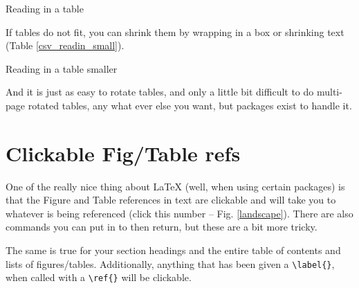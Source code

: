 \begin{table}[h]
\centering
\caption[Normal size table]{Reading in a table}
\label{csv_readin}
\end{table}

If tables do not fit, you can shrink them by wrapping in a box or shrinking text (Table \ref{csv_readin_small}).

\begin{table}[h]
\tiny %
\centering
\caption[Tiny table]{Reading in a table smaller}
\label{csv_readin_small}
\end{table}

And it is just as easy to rotate tables, and only a little bit difficult to do multi-page rotated tables, any what ever else you want, but packages exist to handle it. 

\clearpage %

\section{Clickable Fig/Table refs}

One of the really nice thing about \LaTeX{} (well, when using certain packages) is that the Figure and Table references in text are clickable and will take you to whatever is being referenced (click this number -- Fig. \ref{landscape}). There are also commands you can put in to then return, but these are a bit more tricky. 

The same is true for your section headings and the entire table of contents and lists of figures/tables. Additionally, anything that has been given a \verb+\label{}+, when called with a \verb+\ref{}+ will be clickable. 











